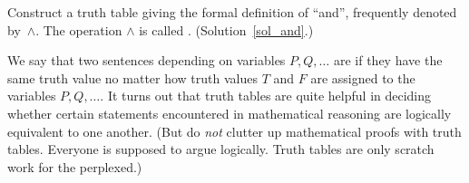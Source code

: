 \begin{exer}\label{and} Construct a truth table giving the formal definition of ``and'',
frequently denoted
by~$\land$.  The operation $\land$ is called
. (Solution~\ref{sol_and}.)
\end{exer}

We say that two sentences depending on variables $P,Q,\dots$ are
 if they have the same truth value no matter how truth values $T$ and
$F$ are assigned to the variables $P,Q,\dots$. It turns out that truth tables are quite
helpful in deciding whether certain statements encountered in mathematical reasoning are
logically equivalent to one another.  (But do \emph{not} clutter up mathematical proofs with
truth tables. Everyone is supposed to argue logically. Truth tables are only scratch work for
the perplexed.)

